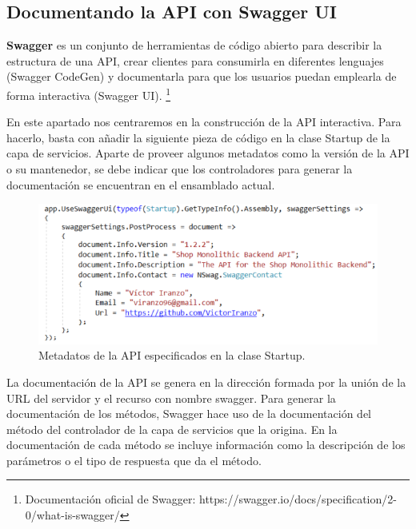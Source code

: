 \documentclass[11pt,spanish,listoffigures]{tfgetsinf}
\begin{document}
\subsection{Documentando la API con Swagger UI}

\textbf{Swagger} es un conjunto de herramientas de código abierto para describir la estructura de una API, crear clientes para consumirla en diferentes lenguajes (Swagger CodeGen) y documentarla para que los usuarios puedan emplearla de forma interactiva (Swagger UI). \footnote{ Documentación oficial de Swagger: https://swagger.io/docs/specification/2-0/what-is-swagger/}

En este apartado nos centraremos en la construcción de la API interactiva. Para hacerlo, basta con añadir la siguiente pieza de código en la clase Startup de la capa de servicios. Aparte de proveer algunos metadatos como la versión de la API o su mantenedor, se debe indicar que los controladores para generar la documentación se encuentran en el ensamblado actual.

\begin{figure}[h]
\centering
\includegraphics[scale=0.9]{SwaggerUI}
\caption{Metadatos de la API especificados en la clase Startup.}
\end{figure}

La documentación de la API se genera en la dirección formada por la unión de la URL del servidor y el recurso con nombre swagger. Para generar la documentación de los métodos, Swagger hace uso de la documentación del método del controlador de la capa de servicios que la origina. En la documentación de cada método se incluye información como la descripción de los parámetros o el tipo de respuesta que da el método.
\end{document}
